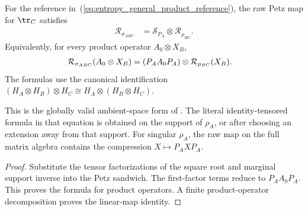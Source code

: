 \begin{theorem}
    \label{thm:entropy_petz_product_tensor}
    \leanok
    For the reference in~(\ref{eq:entropy_general_product_reference}), the raw
    Petz map for $\tr_C$ satisfies
    \begin{align}
        \mathcal R_{\sigma_{ABC}}
        &=\mathcal S_{P_A}\otimes\mathcal R_{\rho_{BC}}.
        \label{eq:entropy_hjpw_product_support_factorization}
    \end{align}
    Equivalently, for every product operator $A_0\otimes X_B$,
    \begin{align}
        \mathcal R_{\sigma_{ABC}}(A_0\otimes X_B)
        &=(P_AA_0P_A)\otimes\mathcal R_{\rho_{BC}}(X_B).
        \notag
    \end{align}
    The formulas use the canonical identification
    $(H_A\otimes H_B)\otimes H_C\cong
    H_A\otimes(H_B\otimes H_C)$.

    This is the globally valid ambient-space form of
    \cite[equation~(10)]{Hayden2004Structure}. The literal identity-tensored
    formula in that equation is obtained on the support of $\rho_A$, or after
    choosing an extension away from that support. For singular $\rho_A$, the
    raw map on the full matrix algebra contains the compression
    $X\mapsto P_AXP_A$.
\end{theorem}

\begin{proof}\leanok
    Substitute the tensor factorizations of the square root and marginal
    support inverse into the Petz sandwich. The first-factor terms reduce to
    $P_AA_0P_A$. This proves the formula for product operators. A finite
    product-operator decomposition proves the linear-map identity.
\end{proof}

